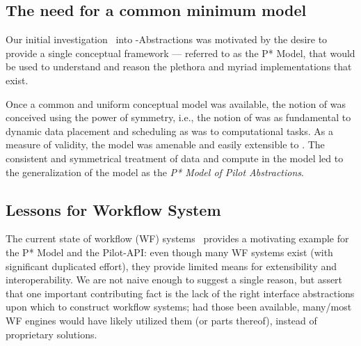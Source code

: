 \documentclass{sig-alternate}
\begin{document}


\subsection{The need for a common minimum model}


Our initial investigation~\cite{Luckow:2008la} into
\pilot-Abstractions was motivated by the desire to provide a single
conceptual framework --- referred to as the P* Model, that would be
used to understand and reason the plethora and myriad \pilotjob
implementations that exist.

 
Once a common and uniform conceptual model was available, the notion
of \pilotdata was conceived using the power of symmetry, i.e., the
notion of \pilotdata was as fundamental to dynamic data placement and
scheduling as \pilotjobs was to computational tasks. As a measure of
validity, the \pstar model was amenable and easily extensible to
\pilotdata.  The consistent and symmetrical treatment of data and
compute in the model led to the generalization of the model as the
{\it P* Model of Pilot Abstractions}.


\subsection{Lessons for Workflow System}

The current state of workflow (WF) systems~\cite{nsf-workflow,1196459}
provides a motivating example for the P* Model and the Pilot-API: even
though many WF systems exist (with significant duplicated effort),
they provide limited means for extensibility and interoperability.  We
are not naive enough to suggest a single reason, but assert that one
important contributing fact is the lack of the right interface
abstractions upon which to construct workflow systems; had those been
available, many/most WF engines would have likely utilized them (or
parts thereof), instead of proprietary solutions.
\end{document}
